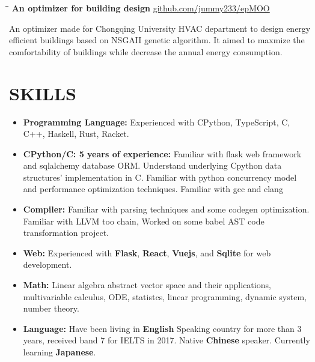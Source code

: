 \documentclass{res}
\begin{document}
\begin{resume}
    \vspace{-0.2in}
    \begin{tabbing}
        \hspace{2.4in}\= \hspace{0.9in}\= \kill
        {\bf An optimizer for building design} \>               \>\url{github.com/jummy233/epMOO}\\
    \end{tabbing}\vspace{-30pt}
    An optimizer made for Chongqing University HVAC department
    to design energy efficient buildings based on NSGAII genetic algorithm.
    It aimed to maxmize the comfortability of buildings while decrease the
    annual energy consumption.

\section{SKILLS}
    \begin{itemize}[leftmargin=-.2in]
        \setlength\itemsep{-1em}

        \item \textbf{Programming Language:} Experienced with CPython, TypeScript, C, C++, Haskell, Rust, Racket.\\
        \item \textbf{CPython/C: 5 years of experience:} Familiar with flask web framework and sqlalchemy database ORM. Understand underlying Cpython data structures' implementation in C. Familiar with python concurrency model and performance optimization techniques. Familiar with gcc and clang\\
        \item \textbf{Compiler:} Familiar with parsing techniques and some codegen optimization. Familiar with LLVM too chain, Worked on some babel AST code transformation project. \\
        \item \textbf{Web:} Experienced with \textbf{Flask}, \textbf{React}, \textbf{Vuejs}, and \textbf{Sqlite} for web development. \\
        \item \textbf{Math:} Linear algebra abstract vector space and their applications, multivariable calculus, ODE, statistcs, linear programming, dynamic system, number theory. \\
        \item \textbf{Language:}
    Have been living in \textbf{English} Speaking country for more than 3 years, received band 7 for IELTS in 2017. Native \textbf{Chinese} speaker. Currently learning \textbf{Japanese}.
    \end{itemize}


\end{resume}
\end{document}
